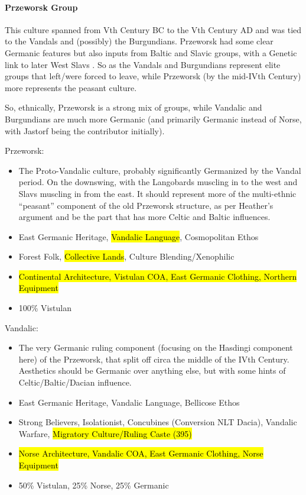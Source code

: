 \documentclass{article}
\begin{document}
	\paragraph{Przeworsk Group}
	This culture spanned from Vth Century BC to the Vth Century AD and was tied to the Vandals and (possibly) the Burgundians.
	Przeworsk had some clear Germanic features but also inputs from Baltic and Slavic groups, with a Genetic link to later West Slavs \cite{SlavGenomes}.
	So as the Vandals and Burgundians represent elite groups that left/were forced to leave, while Przeworsk (by the mid-IVth Century) more represents the peasant culture.
	
	So, ethnically, Przeworsk is a strong mix of groups, while Vandalic and Burgundians are much more Germanic (and primarily Germanic instead of Norse, with Jastorf being the contributor initially).
	
	Przeworsk:
	\begin{itemize}
		\item The Proto-Vandalic culture, probably significantly Germanized by the Vandal period. On the downswing, with the Langobards muscling in to the west and Slavs muscling in from the east.
		It should represent more of the multi-ethnic “peasant” component of the old Przeworsk structure, as per Heather’s argument and be the part that has more Celtic and Baltic influences.
		\item East Germanic Heritage, \hl{Vandalic Language}, Cosmopolitan Ethos
		\item Forest Folk, \hl{Collective Lands}, Culture Blending/Xenophilic
		\item \hl{Continental Architecture, Vistulan COA, East Germanic Clothing, Northern Equipment}
		\item 100\% Vistulan
	\end{itemize}
	
	Vandalic:
	\begin{itemize}
		\item The very Germanic ruling component (focusing on the Hasdingi component here) of the Przeworsk, that split off circa the middle of the IVth Century.
		Aesthetics should be Germanic over anything else, but with some hints of Celtic/Baltic/Dacian influence.
		\item East Germanic Heritage, Vandalic Language, Bellicose Ethos
		\item Strong Believers, Isolationist, Concubines (Conversion NLT Dacia), Vandalic Warfare, \hl{Migratory Culture/Ruling Caste (395)}
		\item \hl{Norse Architecture, Vandalic COA, East Germanic Clothing, Norse Equipment}
		\item 50\% Vistulan, 25\% Norse, 25\% Germanic
	\end{itemize}
	
\end{document}
